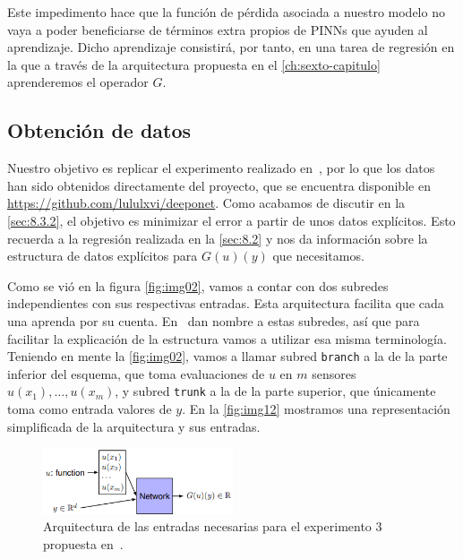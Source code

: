 Este impedimento hace que la función de pérdida asociada a nuestro modelo no vaya a poder beneficiarse de términos extra propios de PINNs que ayuden al aprendizaje. Dicho aprendizaje consistirá, por tanto, en una tarea de regresión en la que a través de la arquitectura propuesta en el \autoref{ch:sexto-capitulo} aprenderemos el operador $G$. 

\subsection{Obtención de datos}\label{sec:8.4.3}

Nuestro objetivo es replicar el experimento realizado en~\cite{lu2024deeponet}, por lo que los datos han sido obtenidos directamente del proyecto, que se encuentra disponible en \hyperlink{https://github.com/lululxvi/deeponet}{https://github.com/lululxvi/deeponet}. Como acabamos de discutir en la \autoref{sec:8.3.2}, el objetivo es minimizar el error a partir de unos datos explícitos. Esto recuerda a la regresión realizada en la \autoref{sec:8.2} y nos da información sobre la estructura de datos explícitos para $G(u)(y)$ que necesitamos.

Como se vió en la figura \autoref{fig:img02}, vamos a contar con dos subredes independientes con sus respectivas entradas. Esta arquitectura facilita que cada una aprenda por su cuenta. En~\cite{lu2024deeponet} dan nombre a estas subredes, así que para facilitar la explicación de la estructura vamos a utilizar esa misma terminología. Teniendo en mente la \autoref{fig:img02}, vamos a llamar subred \texttt{branch} a la de la parte inferior del esquema, que toma evaluaciones de $u$ en $m$ sensores $u(x_{1}),\dots,u(x_{m})$, y subred \texttt{trunk} a la de la parte superior, que únicamente toma como entrada valores de $y$. En la \autoref{fig:img12} mostramos una representación simplificada de la arquitectura y sus entradas.


 \begin{figure}[htbp]
    \centering
    \includegraphics[width=0.5\textwidth]{img/img12.png}
    \caption{Arquitectura de las entradas necesarias para el experimento 3 propuesta en~\cite{lu2024deeponet}.}
    \label{fig:img12}
\end{figure}

